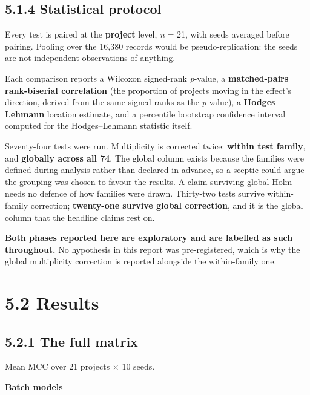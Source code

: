 \subsection{5.1.4 Statistical protocol}\label{statistical-protocol}

Every test is paired at the \textbf{project} level, \emph{n} = 21, with
seeds averaged before pairing. Pooling over the 16,380 records would be
pseudo-replication: the seeds are not independent observations of
anything.

Each comparison reports a Wilcoxon signed-rank \emph{p}-value, a
\textbf{matched-pairs rank-biserial correlation} (the proportion of
projects moving in the effect's direction, derived from the same signed
ranks as the \emph{p}-value), a \textbf{Hodges--Lehmann} location
estimate, and a percentile bootstrap confidence interval computed for
the Hodges--Lehmann statistic itself.

Seventy-four tests were run. Multiplicity is corrected twice:
\textbf{within test family}, and \textbf{globally across all 74}. The
global column exists because the families were defined during analysis
rather than declared in advance, so a sceptic could argue the grouping
was chosen to favour the results. A claim surviving global Holm needs no
defence of how families were drawn. Thirty-two tests survive
within-family correction; \textbf{twenty-one survive global correction},
and it is the global column that the headline claims rest on.

\textbf{Both phases reported here are exploratory and are labelled as
such throughout.} No hypothesis in this report was pre-registered, which
is why the global multiplicity correction is reported alongside the
within-family one.

\section{5.2 Results}\label{results}

\subsection{5.2.1 The full matrix}\label{the-full-matrix}

Mean MCC over 21 projects \ensuremath{\times} 10 seeds.

\textbf{Batch models}

